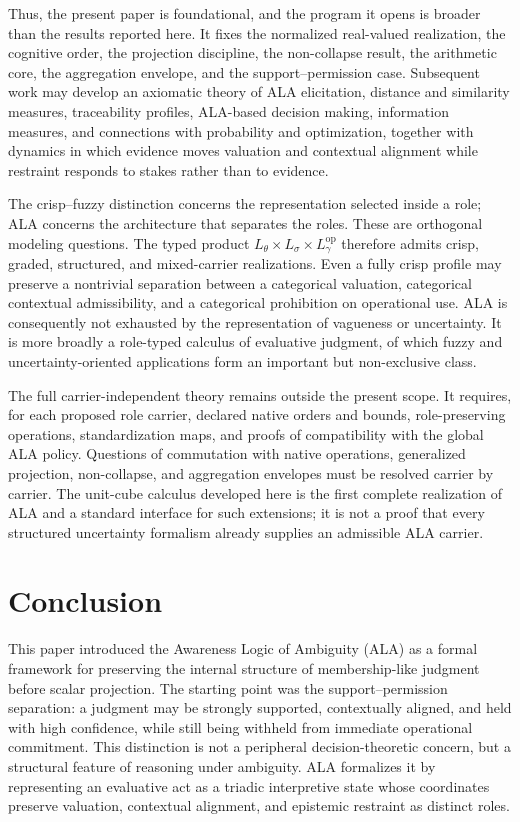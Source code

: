 \documentclass[reqno,final]{amsart}
\theoremstyle{definition}
\theoremstyle{plain}
\theoremstyle{remark}
\begin{document}
Thus, the present paper is foundational, and the program it opens is broader than the results reported here. It fixes the normalized real-valued realization, the cognitive order, the projection discipline, the non-collapse result, the arithmetic core, the aggregation envelope, and the support--permission case. Subsequent work may develop an axiomatic theory of ALA elicitation, distance and similarity measures, traceability profiles, ALA-based decision making, information measures, and connections with probability and optimization, together with dynamics in which evidence moves valuation and contextual alignment while restraint responds to stakes rather than to evidence.

The crisp--fuzzy distinction concerns the representation selected inside a role; ALA concerns the architecture that separates the roles. These are orthogonal modeling questions. The typed product \(L_\theta\times L_\sigma\times L_\gamma^{\mathrm{op}}\) therefore admits crisp, graded, structured, and mixed-carrier realizations. Even a fully crisp profile may preserve a nontrivial separation between a categorical valuation, categorical contextual admissibility, and a categorical prohibition on operational use. ALA is consequently not exhausted by the representation of vagueness or uncertainty. It is more broadly a role-typed calculus of evaluative judgment, of which fuzzy and uncertainty-oriented applications form an important but non-exclusive class.

The full carrier-independent theory remains outside the present scope. It requires, for each proposed role carrier, declared native orders and bounds, role-preserving operations, standardization maps, and proofs of compatibility with the global ALA policy. Questions of commutation with native operations, generalized projection, non-collapse, and aggregation envelopes must be resolved carrier by carrier. The unit-cube calculus developed here is the first complete realization of ALA and a standard interface for such extensions; it is not a proof that every structured uncertainty formalism already supplies an admissible ALA carrier.

\section{Conclusion}
\label{sec:conclusion}

This paper introduced the Awareness Logic of Ambiguity (ALA) as a formal framework for preserving the internal structure of membership-like judgment before scalar projection. The starting point was the support--permission separation: a judgment may be strongly supported, contextually aligned, and held with high confidence, while still being withheld from immediate operational commitment. This distinction is not a peripheral decision-theoretic concern, but a structural feature of reasoning under ambiguity. ALA formalizes it by representing an evaluative act as a triadic interpretive state whose coordinates preserve valuation, contextual alignment, and epistemic restraint as distinct roles.
\end{document}
